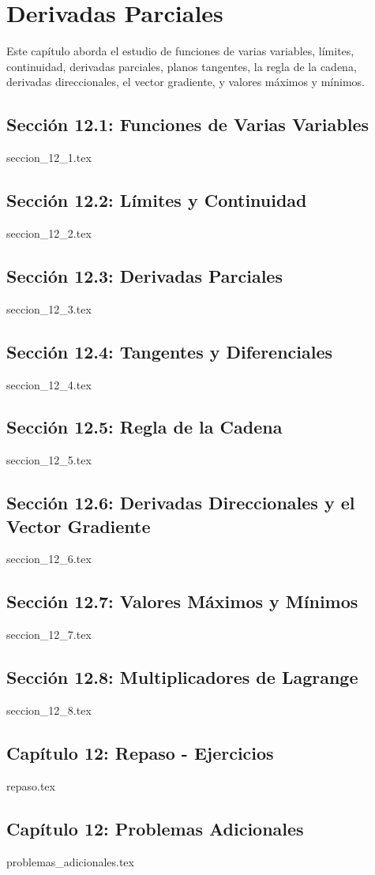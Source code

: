\chapter{Derivadas Parciales}
\label{cap:derivadas_parciales}

Este capítulo aborda el estudio de funciones de varias variables, límites, continuidad, derivadas parciales, planos tangentes, la regla de la cadena, derivadas direccionales, el vector gradiente, y valores máximos y mínimos.

\section*{Sección 12.1: Funciones de Varias Variables}
{seccion_12_1.tex}

\section*{Sección 12.2: Límites y Continuidad}
{seccion_12_2.tex}

\section*{Sección 12.3: Derivadas Parciales}
{seccion_12_3.tex}

\section*{Sección 12.4: Tangentes y Diferenciales}
{seccion_12_4.tex}

\section*{Sección 12.5: Regla de la Cadena}
{seccion_12_5.tex}

\section*{Sección 12.6: Derivadas Direccionales y el Vector Gradiente}
{seccion_12_6.tex}

\section*{Sección 12.7: Valores Máximos y Mínimos}
{seccion_12_7.tex}

\section*{Sección 12.8: Multiplicadores de Lagrange}
{seccion_12_8.tex}

\section*{Capítulo 12: Repaso - Ejercicios}
{repaso.tex}

\section*{Capítulo 12: Problemas Adicionales}
{problemas_adicionales.tex}
